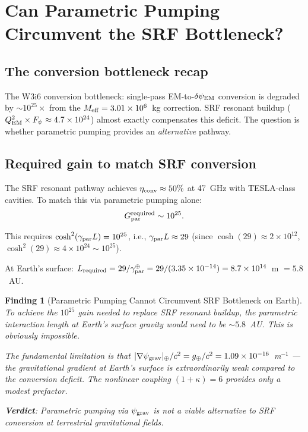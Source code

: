\documentclass[11pt]{article}
\newtheorem{finding}{Finding}
\newcommand{\ee}[1]{\times 10^{#1}}
\newcommand{\psigrav}{\psi_{\rm grav}}
\newcommand{\dpsiEM}{\delta\psi_{\rm EM}}
\newcommand{\Meff}{M_{\rm eff}}
\begin{document}
\section{Can Parametric Pumping Circumvent the SRF Bottleneck?}
\label{sec:circumvent}

\subsection{The conversion bottleneck recap}

The W3i6 conversion bottleneck: single-pass EM-to-$\dpsiEM$ conversion is
degraded by $\sim 10^{25}\times$ from the $\Meff = 3.01\ee{6}$~kg
correction. SRF resonant buildup ($Q_{\rm EM}^2 \times F_\psi \approx
4.7\ee{24}$) almost exactly compensates this deficit. The question is
whether parametric pumping provides an \emph{alternative} pathway.

\subsection{Required gain to match SRF conversion}

The SRF resonant pathway achieves $\eta_{\rm conv} \approx 50\%$ at
47~GHz with TESLA-class cavities. To match this via parametric pumping
alone:
\begin{equation}
G_{\rm par}^{\rm required} \sim 10^{25}.
\end{equation}

This requires $\cosh^2(\gamma_{\rm par}L) = 10^{25}$, i.e.,
$\gamma_{\rm par}L \approx 29$ (since $\cosh(29) \approx 2\ee{12}$,
$\cosh^2(29) \approx 4\ee{24} \sim 10^{25}$).

At Earth's surface: $L_{\rm required} = 29/\gamma_{\rm par}^{\oplus}
= 29/(3.35\ee{-14}) = 8.7\ee{14}$~m $= 5.8$~AU.

\begin{finding}[Parametric Pumping Cannot Circumvent SRF Bottleneck on Earth]
\label{find:no-circumvent}
To achieve the $10^{25}$ gain needed to replace SRF resonant buildup,
the parametric interaction length at Earth's surface gravity would need
to be $\sim 5.8$~AU. This is obviously impossible.

The fundamental limitation is that $|\nabla\psigrav|_\oplus/c^2 =
g_\oplus/c^2 = 1.09\ee{-16}$~m$^{-1}$ --- the gravitational gradient
at Earth's surface is extraordinarily weak compared to the conversion
deficit. The nonlinear coupling $(1+\kappa) = 6$ provides only a modest
prefactor.

\textbf{Verdict}: Parametric pumping via $\psigrav$ is not a viable
alternative to SRF conversion at terrestrial gravitational fields.
\end{finding}
\end{document}

